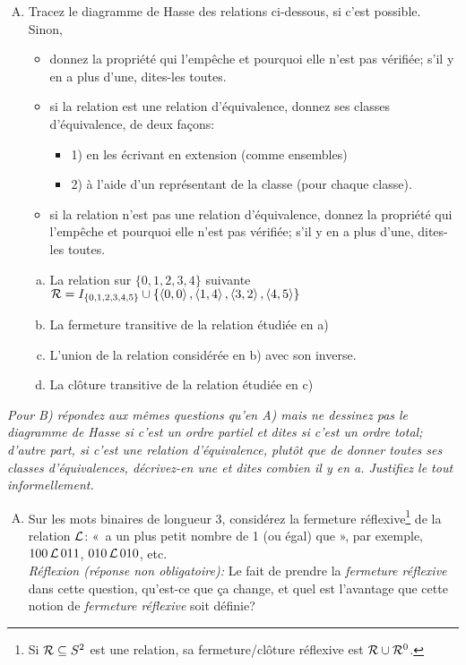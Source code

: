 \documentclass[11pt]{article}
\newcommand{\tuple}[1]{\ensuremath{\left\langle #1 \right\rangle}}  %
\newcounter{exercice}\newcommand{\exercice}{ \bigskip \addtocounter{exercice}{1}\noindent \textbf{Exercice \theexercice}\\}
\begin{document}
\exercice\vspace{-3mm}
\begin{enumerate}[A)]%
\item  Tracez le diagramme de Hasse des relations ci-dessous, si c'est possible.  Sinon, 
\begin{itemize}
\item donnez la propriété qui l'empêche et pourquoi elle n'est pas vérifiée; s'il y en a plus d'une, dites-les toutes.
\item  si la relation est une relation d'équivalence, donnez ses classes d'équivalence, de deux façons: 
\begin{itemize}%
\item 1) en les écrivant en extension (comme ensembles) 
\item 2) à l'aide d'un représentant de la classe (pour chaque classe).
\end{itemize}
\item si la relation n'est pas une relation d'équivalence, donnez la propriété qui l'empêche et pourquoi elle n'est pas vérifiée; s'il y en a plus d'une, dites-les toutes.
\end{itemize}


\begin{enumerate}[a)]%
\item  La relation sur $\{0,1,2,3,4\}$  suivante 
${\cal R} = I_{\{0,1,2,3,4,5\}} \cup\{  \tuple{0,0},\tuple{1,4}, \tuple{3,2},\tuple{4,5}\}$
\item La fermeture transitive de la relation étudiée en a)
\item  L'union de la relation considérée en b) avec son inverse.
\item  La clôture transitive de la relation étudiée en c)
\end{enumerate}\end{enumerate}
\noindent
\emph{Pour B) répondez aux mêmes questions qu'en A)  mais ne dessinez pas le diagramme de Hasse si c'est un ordre partiel et dites  si c'est un ordre total; d'autre part, si c'est une relation d'équivalence, plutôt que de donner toutes ses classes d'équivalences, décrivez-en une et dites combien il y en a. Justifiez le tout informellement.}
\begin{enumerate}[B)]
\item Sur les mots binaires de longueur 3, considérez la fermeture réflexive\footnote{Si ${\cal R}\subseteq S^2$ est une relation, sa fermeture/clôture réflexive est ${\cal R}\cup {\cal R}^0$.} de la relation ${\cal L}$: «~a un plus petit nombre de 1  (ou égal) que », par exemple, $100\,{\cal L}\, 011$, $010\,{\cal L}\, 010$, etc. 
\\ \emph{Réflexion (réponse non obligatoire):} Le fait de prendre la \emph{fermeture réflexive} dans cette question, qu'est-ce que ça change, et quel est l'avantage que cette notion de \emph{fermeture réflexive} soit définie?
\end{enumerate}
\newpage
\end{document}
